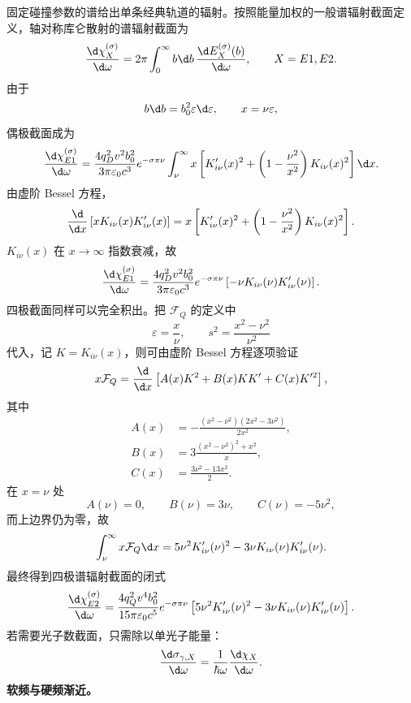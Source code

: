 固定碰撞参数的谱给出单条经典轨道的辐射。按照能量加权的一般谱辐射截面定义，轴对称库仑散射的谱辐射截面为
\begin{equation*}
	\frac{\d\chi_X^{(\sigma)}}{\d\omega}
	=2\pi\int_0^\infty b\d b\,
	\frac{\d E_X^{(\sigma)}(b)}{\d\omega},
	\qquad X=E1,E2.
\end{equation*}
由于
\begin{equation*}
	b\d b=b_0^2\varepsilon\d\varepsilon,
	\qquad
	x=\nu\varepsilon,
\end{equation*}
偶极截面成为
\begin{equation*}
	\frac{\d\chi_{E1}^{(\sigma)}}{\d\omega}
	=\frac{4q_D^2v^2b_0^2}{3\pi\varepsilon_0c^3}e^{-\sigma\pi\nu}
	\int_\nu^\infty x\left[
	K_{i\nu}'(x)^2+
	\left(1-\frac{\nu^2}{x^2}\right)K_{i\nu}(x)^2
	\right]\d x.
\end{equation*}
由虚阶 Bessel 方程，
\begin{equation*}
	\frac{\d}{\d x}\left[xK_{i\nu}(x)K_{i\nu}'(x)\right]
	=x\left[
	K_{i\nu}'(x)^2+
	\left(1-\frac{\nu^2}{x^2}\right)K_{i\nu}(x)^2
	\right].
\end{equation*}
$K_{i\nu}(x)$ 在 $x\to\infty$ 指数衰减，故
\begin{equation*}
	\frac{\d\chi_{E1}^{(\sigma)}}{\d\omega}
	=\frac{4q_D^2v^2b_0^2}{3\pi\varepsilon_0c^3}
	e^{-\sigma\pi\nu}
	\left[-\nu K_{i\nu}(\nu)K_{i\nu}'(\nu)\right].
\end{equation*}
四极截面同样可以完全积出。把 $\mathcal F_Q$ 的定义中
\begin{equation*}
	\varepsilon=\frac{x}{\nu},
	\qquad
	s^2=\frac{x^2-\nu^2}{\nu^2}
\end{equation*}
代入，记 $K=K_{i\nu}(x)$，则可由虚阶 Bessel 方程逐项验证
\begin{equation*}
	x\mathcal F_Q
	=\frac{\d}{\d x}
	\left[A(x)K^2+B(x)KK'+C(x)K'^2\right],
\end{equation*}
其中
\begin{equation*}
	\begin{aligned}
	A(x)&=-\frac{(x^2-\nu^2)(2x^2-3\nu^2)}{2x^2},\\
	B(x)&=3\frac{(x^2-\nu^2)^2+x^2}{x},\\
	C(x)&=\frac{3\nu^2-13x^2}{2}.
	\end{aligned}
\end{equation*}
在 $x=\nu$ 处
\begin{equation*}
	A(\nu)=0,
	\qquad
	B(\nu)=3\nu,
	\qquad
	C(\nu)=-5\nu^2,
\end{equation*}
而上边界仍为零，故
\begin{equation*}
	\int_\nu^\infty x\mathcal F_Q\d x
	=5\nu^2K_{i\nu}'(\nu)^2
	-3\nu K_{i\nu}(\nu)K_{i\nu}'(\nu).
\end{equation*}
最终得到四极谱辐射截面的闭式
\begin{equation*}
	\frac{\d\chi_{E2}^{(\sigma)}}{\d\omega}
	=\frac{4q_Q^2v^4b_0^2}{15\pi\varepsilon_0c^5}
	e^{-\sigma\pi\nu}
	\left[
	5\nu^2K_{i\nu}'(\nu)^2
	-3\nu K_{i\nu}(\nu)K_{i\nu}'(\nu)
	\right].
\end{equation*}
若需要光子数截面，只需除以单光子能量：
\begin{equation*}
	\frac{\d\sigma_{\gamma,X}}{\d\omega}
	=\frac{1}{\hbar\omega}\frac{\d\chi_X}{\d\omega}.
\end{equation*}
\textbf{软频与硬频渐近。}

